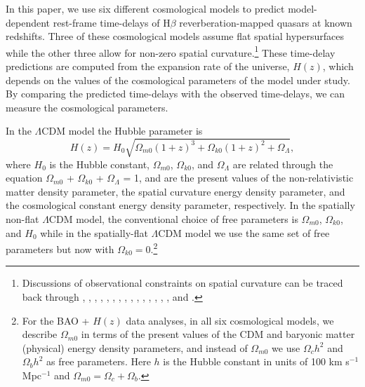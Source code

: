 \documentclass[a4paper,fleqn,usenatbib]{mnras}
\begin{document}
In this paper, we use six different cosmological models to predict model-dependent rest-frame time-delays of H$\beta$ reverberation-mapped quasars at known redshifts. Three of these cosmological models assume flat spatial hypersurfaces while the other three allow for non-zero spatial curvature.\footnote{Discussions of observational constraints on spatial curvature can be traced back through \citet{Chenetal2016}, \citet{Ranaetal2017}, \citet{Oobaetal2018a, Oobaetal2018b}, \citet{Yuetal2018}, \citet{ParkRatra2019a, ParkRatra2019b}, \citet{Wei2018}, \citet{DESCollaboration2019}, \citet{Lietal2020}, \citet{Handley2019}, \citet{EfstathiouGratton2020}, \citet{DiValentinoetal2021a}, \citet{VelasquezToribioFabris2020}, \citet{Vagnozzietal2020, Vagnozzietal2021}, \citet{KiDSCollaboration2021}, \citet{ArjonaNesseris2021}, and \citet{Dhawanetal2021}.} These time-delay predictions are computed from the expansion rate of the universe, $H(z)$, which depends on the values of the cosmological parameters of the model under study. By comparing the predicted time-delays with the observed time-delays, we can measure the cosmological parameters.

In the $\Lambda$CDM model the Hubble parameter is
\begin{equation}
\label{eq:friedLCDM}
    H(z) = H_0\sqrt{\Omega_{m0}(1+z)^3 + \Omega_{k0}(1+z)^2 + \Omega_{\Lambda}},
\end{equation}
where $H_0$ is the Hubble constant, $\Omega_{m0}$, $\Omega_{k0}$, and $\Omega_{\Lambda}$ are related through the equation $\Omega_{m0}$ + $\Omega_{k0}$ + $\Omega_{\Lambda}$ = 1, and are the present values of the non-relativistic matter density parameter, the spatial curvature energy density parameter, and the cosmological constant energy density parameter, respectively. In the spatially non-flat $\Lambda$CDM model, the conventional choice of free parameters is $\Omega_{m0}$, $\Omega_{k0}$, and $H_0$ while in the spatially-flat $\Lambda$CDM model we use the same set of free parameters but now with $\Omega_{k0} = 0$.\footnote{For the BAO + $H(z)$ data analyses, in all six cosmological models, we describe $\Omega_{m0}$ in terms of the present values of the CDM and baryonic matter (physical) energy density parameters, and instead of $\Omega_{m0}$ we use $\Omega_c h^2$ and $\Omega_b h^2$ as free parameters. Here $h$ is the Hubble constant in units of 100 km s$^{-1}$ Mpc$^{-1}$ and $\Omega_{m0} = \Omega_c + \Omega_b$.}
\end{document}
